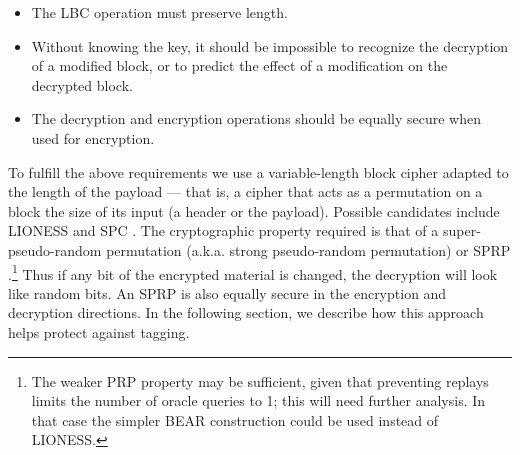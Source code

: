 \documentclass[final,inpress,inline]{ieee}
\begin{document}
\begin{itemize}
\item The LBC operation must preserve length.
\item Without knowing the key, it should be impossible to recognize the
   decryption of a modified block, or to predict the effect of a modification
   on the decrypted block.
\item The decryption and encryption operations should be equally secure when
  used for encryption.
\end{itemize}

To fulfill the above requirements we use a variable-length block
cipher adapted to the length of the payload --- that
is, a cipher that acts as a permutation on a block the size of its
input (a header or the payload).  Possible candidates
include LIONESS \cite{BEAR-LIONESS} and SPC \cite{SPC}.
The cryptographic property required is that of a super-pseudo-random
permutation (a.k.a. strong pseudo-random permutation) or SPRP \cite{sprp}.\footnote{
The weaker PRP property may be sufficient, given that preventing
replays limits the number of oracle queries to 1; this will need
further analysis.  In that case the simpler BEAR construction
\cite{BEAR-LIONESS} could be used instead of LIONESS.}
Thus if any bit of
the encrypted material is changed, the decryption will look like random
bits.  An SPRP is also equally secure in the encryption and decryption
directions.  In the following section, we describe
how this approach helps protect against tagging.


%
\end{document}
